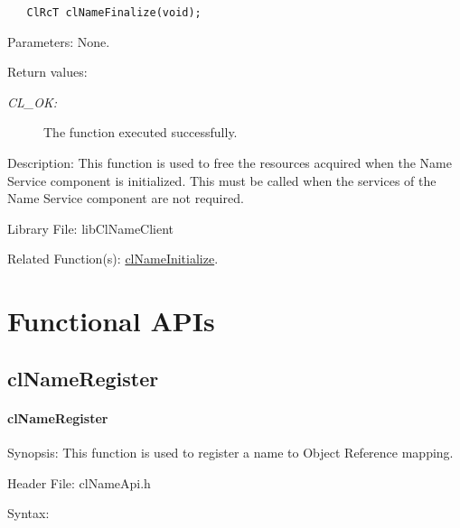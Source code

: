 \begin{flushleft}
\begin{Desc}
\footnotesize\begin{verbatim}   ClRcT clNameFinalize(void); 
\end{verbatim}
\normalsize
\end{Desc}
\begin{Desc}
\item[Parameters:]None.\end{Desc}
\begin{Desc}
\item[Return values:]
\begin{description}
\item[{\em CL\_\-OK:}]The function executed successfully.\end{description}
\end{Desc}
\begin{Desc}
\item[Description:]This function is used to free the resources acquired when the Name Service component is initialized. This must be called when the 
services of the Name Service component are not required.\end{Desc}
\begin{Desc}
\item[Library File:]lib\-Cl\-Name\-Client\end{Desc}
\begin{Desc}
\item[Related Function(s):]\hyperlink{pagens101}{cl\-Name\-Initialize}. \end{Desc}
\newpage


\section{Functional APIs}
\subsection{clNameRegister}
\hypertarget{pagens103}{}\paragraph{cl\-Name\-Register}\label{pagens103}
\begin{Desc}
\item[Synopsis:]This function is used to register a name to Object Reference mapping. \end{Desc}
\begin{Desc}
\item[Header File:]clNameApi.h\end{Desc}
\begin{Desc}
\item[Syntax:]


\end{Desc}
\end{flushleft}
